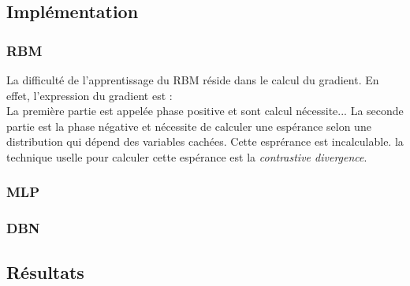 \documentclass[10pt,a4paper]{article}
\author{Vincent Bodin et Antoine Biard}
\begin{document}
\subsection{Implémentation}

\subsubsection{RBM}
La difficulté de l'apprentissage du RBM réside dans le calcul du gradient. En effet, l'expression du gradient est :
\[\]
La première partie est appelée phase positive et sont calcul nécessite... La seconde partie est la phase négative et nécessite de calculer une espérance selon une distribution qui dépend des variables cachées. Cette esprérance est incalculable. la technique uselle pour calculer cette espérance est la \emph{contrastive divergence}.

\subsubsection{MLP}

\subsubsection{DBN}


\subsection{Résultats}
\end{document}
